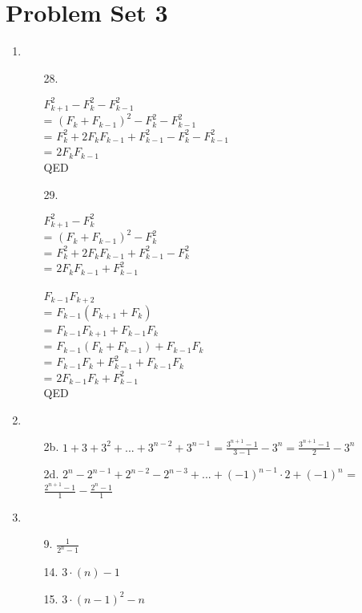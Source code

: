 \documentclass[12pt]{article}
\begin{document}
\section*{Problem Set 3}
\begin{enumerate}[label = (\alph*)]
    \item 

        \begin{itemize}
            \item [28.]

                $F_{k+1}^2 - F_k^2 - F_{k-1}^2$ \\
                = $(F_k + F_{k-1})^2 - F_k^2 - F_{k-1}^2$ \\
                = $F_k^2 + 2F_kF_{k-1} + F_{k-1}^2 - F_k^2 - F_{k-1}^2$ \\
                = $2F_kF_{k-1}$ \\ QED

            \item [29.]

                $F_{k+1}^2 - F_k^2$ \\
                = $(F_{k} + F_{k-1})^2 - F_k^2$ \\
                = $F_{k}^2 + 2F_{k}F_{k-1} + F_{k-1}^2 - F_k^2$ \\
                = $2F_{k}F_{k-1} + F_{k-1}^2$ \\
                \\ 
                $F_{k-1}F_{k+2}$ \\
                = $F_{k-1}(F_{k+1}+F_{k})$ \\
                = $F_{k-1}F_{k+1}+F_{k-1}F_{k}$ \\
                = $F_{k-1}(F_{k}+F_{k-1})+F_{k-1}F_{k}$ \\
                = $F_{k-1}F_{k}+F_{k-1}^2+F_{k-1}F_{k}$ \\
                = $2F_{k-1}F_{k}+F_{k-1}^2$ \\ QED

        \end{itemize}

    \item 
        \begin{itemize}
            \item [2b.]
                $1 + 3 + 3^2 + ... + 3^{n-2} + 3^{n-1} = \frac{3^{n+1}-1}{3-1} - 3^n = \frac{3^{n+1}-1}{2}-3^n$
            \item [2d.]
                $2^n - 2^{n-1} + 2^{n-2} - 2^{n-3} + ... + (-1)^{n-1} \cdot 2 + (-1)^n$
                = $\frac{2^{n+1}-1}{1} - \frac{2^n-1}{1}$
        \end{itemize}

    \item 
        \begin{itemize}
            \item [9.]
                $\frac{1}{{2}^{n}-1}$
            \item [14.]
                $3\cdot (n) - 1$
            \item [15.]
                $3\cdot (n-1)^2 - n$
        \end{itemize}
\end{enumerate}
\end{document}

